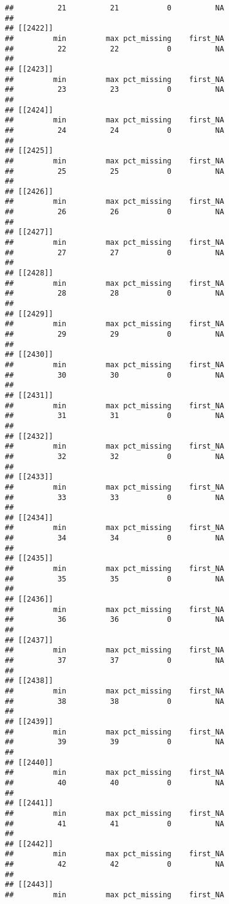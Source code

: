 \documentclass[
]{article}
\begin{document}
\begin{verbatim}
##          21          21           0          NA 
## 
## [[2422]]
##         min         max pct_missing    first_NA 
##          22          22           0          NA 
## 
## [[2423]]
##         min         max pct_missing    first_NA 
##          23          23           0          NA 
## 
## [[2424]]
##         min         max pct_missing    first_NA 
##          24          24           0          NA 
## 
## [[2425]]
##         min         max pct_missing    first_NA 
##          25          25           0          NA 
## 
## [[2426]]
##         min         max pct_missing    first_NA 
##          26          26           0          NA 
## 
## [[2427]]
##         min         max pct_missing    first_NA 
##          27          27           0          NA 
## 
## [[2428]]
##         min         max pct_missing    first_NA 
##          28          28           0          NA 
## 
## [[2429]]
##         min         max pct_missing    first_NA 
##          29          29           0          NA 
## 
## [[2430]]
##         min         max pct_missing    first_NA 
##          30          30           0          NA 
## 
## [[2431]]
##         min         max pct_missing    first_NA 
##          31          31           0          NA 
## 
## [[2432]]
##         min         max pct_missing    first_NA 
##          32          32           0          NA 
## 
## [[2433]]
##         min         max pct_missing    first_NA 
##          33          33           0          NA 
## 
## [[2434]]
##         min         max pct_missing    first_NA 
##          34          34           0          NA 
## 
## [[2435]]
##         min         max pct_missing    first_NA 
##          35          35           0          NA 
## 
## [[2436]]
##         min         max pct_missing    first_NA 
##          36          36           0          NA 
## 
## [[2437]]
##         min         max pct_missing    first_NA 
##          37          37           0          NA 
## 
## [[2438]]
##         min         max pct_missing    first_NA 
##          38          38           0          NA 
## 
## [[2439]]
##         min         max pct_missing    first_NA 
##          39          39           0          NA 
## 
## [[2440]]
##         min         max pct_missing    first_NA 
##          40          40           0          NA 
## 
## [[2441]]
##         min         max pct_missing    first_NA 
##          41          41           0          NA 
## 
## [[2442]]
##         min         max pct_missing    first_NA 
##          42          42           0          NA 
## 
## [[2443]]
##         min         max pct_missing    first_NA 

\end{verbatim}
\end{document}
